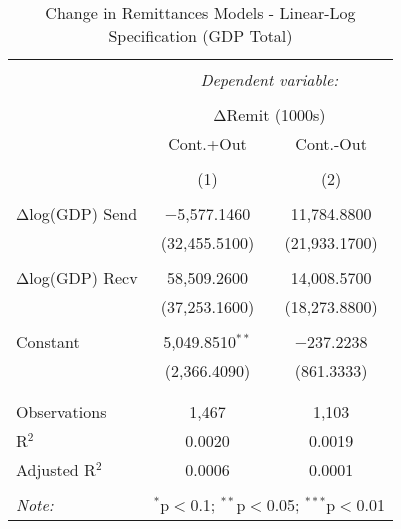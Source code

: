 
\begin{table}[!htbp] \centering 
  \caption{Change in Remittances Models - Linear-Log Specification (GDP Total)} 
  \label{} 
\begin{tabular}{@{\extracolsep{5pt}}lcc} 
\\[-1.8ex]\hline 
\hline \\[-1.8ex] 
 & \multicolumn{2}{c}{\textit{Dependent variable:}} \\ 
\cline{2-3} 
\\[-1.8ex] & \multicolumn{2}{c}{ΔRemit (1000s)} \\ 
 & Cont.+Out & Cont.-Out \\ 
\\[-1.8ex] & (1) & (2)\\ 
\hline \\[-1.8ex] 
 Δlog(GDP) Send & $-$5,577.1460 & 11,784.8800 \\ 
  & (32,455.5100) & (21,933.1700) \\ 
  & & \\ 
 Δlog(GDP) Recv & 58,509.2600 & 14,008.5700 \\ 
  & (37,253.1600) & (18,273.8800) \\ 
  & & \\ 
 Constant & 5,049.8510$^{**}$ & $-$237.2238 \\ 
  & (2,366.4090) & (861.3333) \\ 
  & & \\ 
\hline \\[-1.8ex] 
Observations & 1,467 & 1,103 \\ 
R$^{2}$ & 0.0020 & 0.0019 \\ 
Adjusted R$^{2}$ & 0.0006 & 0.0001 \\ 
\hline 
\hline \\[-1.8ex] 
\textit{Note:}  & \multicolumn{2}{r}{$^{*}$p$<$0.1; $^{**}$p$<$0.05; $^{***}$p$<$0.01} \\ 
\end{tabular} 
\end{table} 
